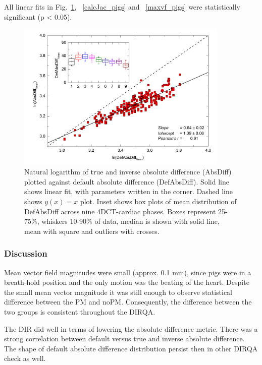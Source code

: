 \documentclass[type=dr, dr=rernat, accentcolor=tud7b,colorbacktitle, bigchapter, openright, twoside, 12pt ]{tudthesis}
\begin{document}
All linear fits in Fig.~\ref{absDiff_pigs}, ~\ref{calcJac_pigs} and ~\ref{maxvf_pigs} were statistically significant (p < 0.05).

\begin{figure}[H]
	\begin{center}		
		\includegraphics[width=0.9\textwidth]{./Images/AbsDiff_pigs.png}
		\caption{Natural logarithm of true and inverse absolute difference (AbsDiff) plotted against default absolute difference (DefAbsDiff). Solid line shows linear fit, with parameters
		written in the corner. Dashed line shows $y(x)=x$ plot. Inset shows box plots of mean distribution of DefAbsDiff across nine 4DCT-cardiac phases. Boxes represent 25-75\%, whiskers 10-90\%
		of data, median is shown with solid line, mean with square and outliers with crosses.}
		\label{absDiff_pigs}
	\end{center}
\end{figure}

\subsubsection{Discussion}

Mean vector field magnitudes were small (approx. 0.1 mm), since pigs were in a breath-hold position and the only motion was the beating of the heart. 
Despite the small mean vector magnitude it was still enough to observe statistical difference between the PM and noPM.
Consequently, the difference between the two groups is consistent throughout the DIRQA.

The DIR did well in terms of lowering the absolute difference metric. There was a strong correlation between default versus true and inverse absolute difference. The shape of default absolute difference
distribution persist then in other DIRQA check as well.
\end{document}
